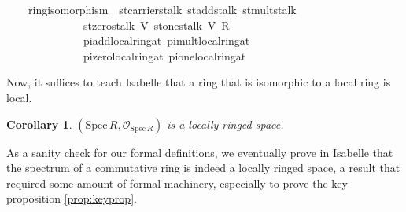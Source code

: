 \documentclass[12pt]{scrartcl}
\newtheorem{cor}[proposition]{Corollary}
\def\spec{\text{Spec}\,R}
\begin{document}
\begin{isabelle}
\ \ \ {\isachardoublequoteopen}{\isasymexists}{\isasymphi}{\isachardot}{\kern0pt}\ ring{\isacharunderscore}{\kern0pt}isomorphism\ {\isasymphi}\ st{\isachardot}{\kern0pt}carrier{\isacharunderscore}{\kern0pt}stalk\ st{\isachardot}{\kern0pt}add{\isacharunderscore}{\kern0pt}stalk\ st{\isachardot}{\kern0pt}mult{\isacharunderscore}{\kern0pt}stalk\ \isanewline
\ \ \ \ \ \ \ \ \ \ \ \ \ \ {\isacharparenleft}{\kern0pt}st{\isachardot}{\kern0pt}zero{\isacharunderscore}{\kern0pt}stalk\ V{\isacharparenright}{\kern0pt}\ {\isacharparenleft}{\kern0pt}st{\isachardot}{\kern0pt}one{\isacharunderscore}{\kern0pt}stalk\ V{\isacharparenright}{\kern0pt}\ {\isacharparenleft}{\kern0pt}R\ \isactrlbsub {\isasympp}\ {\isacharparenleft}{\kern0pt}{\isacharplus}{\kern0pt}{\isacharparenright}{\kern0pt}\ {\isacharparenleft}{\kern0pt}{\isasymcdot}{\isacharparenright}{\kern0pt}\ {\isasymzero}\isactrlesub {\isacharparenright}{\kern0pt}\ \isanewline
\ \ \ \ \ \ \ \ \ \ \ \ \ \ {\isacharparenleft}{\kern0pt}pi{\isachardot}{\kern0pt}add{\isacharunderscore}{\kern0pt}local{\isacharunderscore}{\kern0pt}ring{\isacharunderscore}{\kern0pt}at{\isacharparenright}{\kern0pt}\ {\isacharparenleft}{\kern0pt}pi{\isachardot}{\kern0pt}mult{\isacharunderscore}{\kern0pt}local{\isacharunderscore}{\kern0pt}ring{\isacharunderscore}{\kern0pt}at{\isacharparenright}{\kern0pt}\ \isanewline
\ \ \ \ \ \ \ \ \ \ \ \ \ \ {\isacharparenleft}{\kern0pt}pi{\isachardot}{\kern0pt}zero{\isacharunderscore}{\kern0pt}local{\isacharunderscore}{\kern0pt}ring{\isacharunderscore}{\kern0pt}at{\isacharparenright}{\kern0pt}\ {\isacharparenleft}{\kern0pt}pi{\isachardot}{\kern0pt}one{\isacharunderscore}{\kern0pt}local{\isacharunderscore}{\kern0pt}ring{\isacharunderscore}{\kern0pt}at{\isacharparenright}{\kern0pt}{\isachardoublequoteclose}\isanewline
\isanewline
{}
\end{isabelle}

Now, it suffices to teach Isabelle that a ring that is isomorphic to a local ring is local.

	
\begin{cor}
	$(\text{Spec}\,R, \mathscr{O}_{\spec})$ is a locally ringed space.
\end{cor}

As a sanity check for our formal definitions, we eventually prove in Isabelle that the spectrum of a commutative ring is indeed a locally ringed space, a result that required some amount of formal machinery, especially to prove the key proposition \ref{prop:keyprop}.
\end{document}
